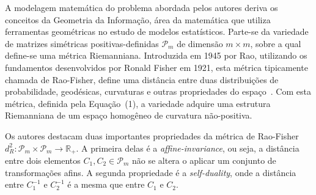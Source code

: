 \documentclass[a4paper,titlepage]{article}
\begin{document}
\begin{center}
  \vspace{1em}
  \vspace{1em}
\end{center}

A modelagem matemática do problema abordada pelos autores deriva os conceitos
da Geometria da Informação, área da matemática que utiliza ferramentas
geométricas no estudo de modelos estatísticos. Parte-se da variedade de
matrizes simétricas positivas-definidas $\mathcal{P}_m$ de dimensão $m \times
m$, sobre a qual define-se uma métrica Riemanniana. Introduzida em 1945 por
Rao, utilizando os fundamentos desenvolvidos por Ronald Fisher em 1921, esta
métrica tipicamente chamada de Rao-Fisher, define uma distância entre duas
distribuições de probabilidade, geodésicas, curvaturas e outras propriedades do
espaço~\cite{porto2013geometria}. Com esta métrica, definida pela Equação~(1),
a variedade adquire uma estrutura Riemanniana de um espaço homogêneo de
curvatura não-positiva.

Os autores destacam duas importantes propriedades da métrica de Rao-Fisher
$d_R^2 : \mathcal{P}_m \times \mathcal{P}_m \rightarrow \mathbb{R}_+$. A
primeira delas é a \textit{affine-invariance}, ou seja, a distância entre dois
elementos $C_1, C_2 \in \mathcal{P}_m$ não se altera o aplicar um conjunto de
transformações afins. A segunda propriedade é a \textit{self-duality}, onde a
distância entre $C_1^{-1}$ e $C_2^{-1}$ é a mesma que entre $C_1$ e $C_2$.  
\end{document}
